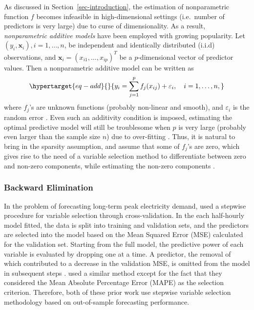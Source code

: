 \documentclass[11pt,a4paper,]{article}
\begin{document}
As discussed in Section~\ref{sec-introduction}, the estimation of
nonparametric function \(f\) becomes infeasible in high-dimensional
settings (i.e.~number of predictors is very large) due to curse of
dimensionality. As a result, \emph{nonparametric additive models} have
been employed with growing popularity. Let
\((y_{i}, \bm{x}_{i}), i = 1, \dots, n\), be independent and identically
distributed (i.i.d) observations, and
\(\bm{x}_{i} = (x_{i1}, \dots, x_{ip})^{T}\) be a \(p\)-dimensional
vector of predictor values. Then a nonparametric additive model can be
written as \begin{equation}\protect\hypertarget{eq-add}{}{
 y_{i} = \sum_{j=1}^{p} {f_{j}(x_{ij})} + \varepsilon_{i}, \quad i = 1, \dots, n,
}\label{eq-add}\end{equation} where \(f_{j}\)'s are unknown functions
(probably non-linear and smooth), and \(\varepsilon_{i}\) is the random
error \autocite{Lian2012}. Even such an additivity condition is imposed,
estimating the optimal predictive model will still be troublesome when
\(p\) is very large (probably even larger than the sample size \(n\))
due to over-fitting \autocite{Lian2012}. Thus, it is natural to bring in
the sparsity assumption, and assume that some of \(f_{j}\)'s are zero,
which gives rise to the need of a variable selection method to
differentiate between zero and non-zero components, while estimating the
non-zero components \autocite{Huang2010}.

\hypertarget{backward-elimination}{%
\subsubsection{Backward Elimination}\label{backward-elimination}}

In the problem of forecasting long-term peak electricity demand,
\textcite{HF2010} used a stepwise procedure for variable selection
through cross-validation. In the each half-hourly model fitted, the data
is split into training and validation sets, and the predictors are
selected into the model based on the Mean Squared Error (MSE) calculated
for the validation set. Starting from the full model, the predictive
power of each variable is evaluated by dropping one at a time. A
predictor, the removal of which contributed to a decrease in the
validation MSE, is omitted from the model in subsequent steps
\autocite{HF2010}. \textcite{FH2012} used a similar method except for
the fact that they considered the Mean Absolute Percentage Error (MAPE)
as the selection criterion. Therefore, both of these prior work use
stepwise variable selection methodology based on out-of-sample
forecasting performance.
\end{document}
